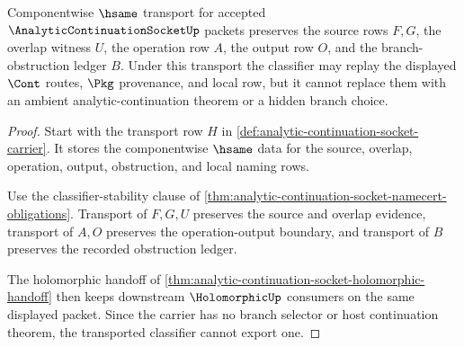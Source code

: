 \begin{theorem}
\label{thm:analytic-continuation-socket-classifier-stability-obligation}
Componentwise $\hsame$ transport for accepted $\AnalyticContinuationSocketUp$ packets preserves the source rows $F,G$, the overlap witness $U$, the operation row $A$, the output row $O$, and the branch-obstruction ledger $B$. Under this transport the classifier may replay the displayed $\Cont$ routes, $\Pkg$ provenance, and local \NameCert{} row, but it cannot replace them with an ambient analytic-continuation theorem or a hidden branch choice.
\end{theorem}
\begin{proof}
Start with the transport row $H$ in \autoref{def:analytic-continuation-socket-carrier}. It stores the componentwise $\hsame$ data for the source, overlap, operation, output, obstruction, and local naming rows.

Use the classifier-stability clause of \autoref{thm:analytic-continuation-socket-namecert-obligations}. Transport of $F,G,U$ preserves the source and overlap evidence, transport of $A,O$ preserves the operation-output boundary, and transport of $B$ preserves the recorded obstruction ledger.

The holomorphic handoff of \autoref{thm:analytic-continuation-socket-holomorphic-handoff} then keeps downstream $\HolomorphicUp$ consumers on the same displayed packet. Since the carrier has no branch selector or host continuation theorem, the transported classifier cannot export one.
\end{proof}

